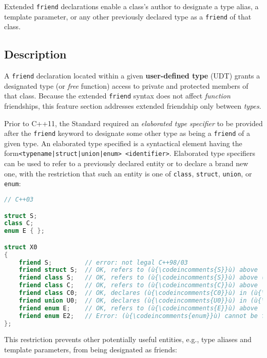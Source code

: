 
Extended \texttt{friend} declarations enable a class's author to
designate a type alias, a template parameter, or any other previously
declared type as a \texttt{friend} of that class.

\subsection[Description]{Description}\label{description-extendedfriend}

A \texttt{friend} declaration located within a given
\textbf{user-defined type} (UDT) grants a designated type (or
\emph{free} function) access to private and protected members of that
class. Because the extended \texttt{friend} syntax does not affect
\emph{function} friendships, this feature section addresses extended
friendship only between \emph{types}.

Prior to C++11, the Standard required an \emph{elaborated type
specifier} to be provided after the \texttt{friend} keyword to designate
some other type as being a \texttt{friend} of a given type. An
elaborated type specified is a syntactical element having the form\linebreak[4]
\mbox{\texttt{<typename|struct|union|enum>}~\texttt{<identifier>}}. Elaborated
type specifiers can be used to refer to a previously declared entity or
to declare a brand new one, with the restriction that such an entity is
one of \texttt{class}, \texttt{struct}, \texttt{union}, or
\texttt{enum}:

\begin{lstlisting}[language=C++]
// C++03

struct S;
class C;
enum E { };

struct X0
{
    friend S;         // error: not legal C++98/03
    friend struct S;  // OK, refers to (ù{\codeincomments{S}}ù) above
    friend class S;   // OK, refers to (ù{\codeincomments{S}}ù) above (might warn)
    friend class C;   // OK, refers to (ù{\codeincomments{C}}ù) above
    friend class C0;  // OK, declares (ù{\codeincomments{C0}}ù) in (ù{\codeincomments{X0}}ù)'s namespace
    friend union U0;  // OK, declares (ù{\codeincomments{U0}}ù) in (ù{\codeincomments{X0}}ù)'s namespace
    friend enum E;    // OK, refers to (ù{\codeincomments{E}}ù) above
    friend enum E2;   // Error: (ù{\codeincomments{enum}}ù) cannot be forward-declared.
};
\end{lstlisting}
    
\noindent This restriction prevents other potentially useful entities, e.g., type
aliases and template parameters, from being designated as friends:

